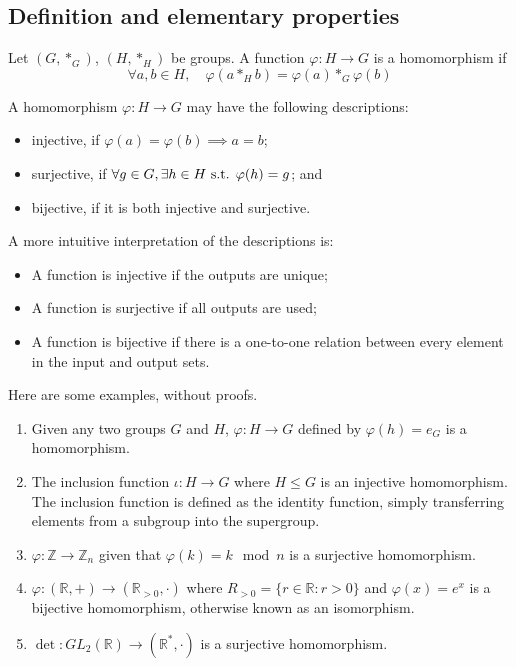 \subsection{Definition and elementary properties}
\begin{definition}
	Let \((G, \ast_G)\), \((H, \ast_H)\) be groups.
	A function \(\varphi: H \to G\) is a homomorphism if
	\[
		\forall a, b \in H,\quad \varphi(a \ast_H b) = \varphi(a) \ast_G \varphi(b)
	\]
\end{definition}
A homomorphism \(\varphi: H \to G\) may have the following descriptions:
\begin{itemize}
	\item injective, if \(\varphi(a) = \varphi(b) \implies a = b\);
	\item surjective, if \(\forall g \in G, \exists h \in H \text{ s.t. } \varphi(h) = g\); and
	\item bijective, if it is both injective and surjective.
\end{itemize}
A more intuitive interpretation of the descriptions is:
\begin{itemize}
	\item A function is injective if the outputs are unique;
	\item A function is surjective if all outputs are used;
	\item A function is bijective if there is a one-to-one relation between every element in the input and output sets.
\end{itemize}
Here are some examples, without proofs.
\begin{enumerate}
	\item Given any two groups \(G\) and \(H\), \(\varphi: H \to G\) defined by \(\varphi(h) = e_G\) is a homomorphism.
	\item The inclusion function \(\iota: H \to G\) where \(H \leq G\) is an injective homomorphism.
	      The inclusion function is defined as the identity function, simply transferring elements from a subgroup into the supergroup.
	\item \(\varphi: \mathbb Z \to \mathbb Z_n\) given that \(\varphi(k) = k \mod n\) is a surjective homomorphism.
	\item \(\varphi: (\mathbb R, +) \to (\mathbb R_{>0}, \cdot)\) where \(R_{>0} = \{r \in \mathbb R : r > 0\}\) and \(\varphi(x) = e^x\) is a bijective homomorphism, otherwise known as an isomorphism.
	\item \(\det : GL_2(\mathbb R) \to (\mathbb R^*, \cdot)\) is a surjective homomorphism.
\end{enumerate}

